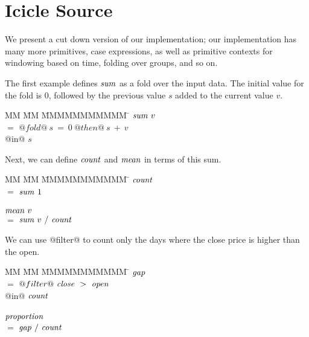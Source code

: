 \section{Icicle Source}
\label{s:Source}

We present a cut down version of our implementation; our implementation has many more primitives, case expressions, as well as primitive contexts for windowing based on time, folding over groups, and so on.

The first example defines $\mathit{sum}$ as a fold over the input data.
The initial value for the fold is $0$, followed by the previous value $s$ added to the current value $v$.

\begin{tabbing}
MM \= MM \= MMMMMMMMMMM \= \kill
$\mathit{sum}~v$    \\
\> $=$  \> $@fold@~s~=~0~@then@~s~+~v$ \\
\> @in@ \> $s$ \\
\end{tabbing}

Next, we can define $\mathit{count}$ and $\mathit{mean}$ in terms of this sum.
\begin{tabbing}
MM \= MM \= MMMMMMMMMMM \= \kill
$\mathit{count}$                                        \\
 \> $=$  \> $\mathit{sum}~1$                            \\
                                                    \\
$\mathit{mean}~v$                                       \\
 \> $=$  \> $\mathit{sum}~v~/~\mathit{count}$               \\
\end{tabbing}

We can use @filter@ to count only the days where the close price is higher than the open.
\begin{tabbing}
MM \= MM \= MMMMMMMMMMM \= \kill
$\mathit{gap}$                                          \\
 \> $=$  \> $@filter@~\mathit{close}~>~\mathit{open}$       \\
 \> @in@ \> $\mathit{count}$                            \\
                                                    \\
$\mathit{proportion}$                                   \\
 \> $=$  \> $\mathit{gap}~/~\mathit{count}$
\end{tabbing}

